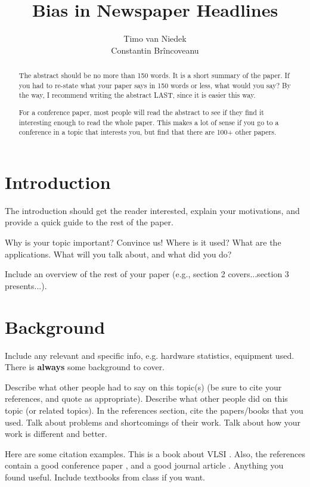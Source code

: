 \documentclass[final]{ieee}
\title[journalExample]{Bias in Newspaper Headlines}
\author[Lastname]{%
   Timo van Niedek\member{Student} \\
   Constantin Br\^{i}ncoveanu\member{Student}
    \authorinfo{%
     Cognitive Computational Modeling of Language and Web Interaction,\\
      SOW-MKI61-2016-SEM2-V, 13th July 2017, Dr. G.E. Kachergis. \\
      email: \mbox{c.brincoveanu@student.ru.nl}} 
}
\begin{document}
\maketitle


\begin{abstract}
The abstract should be no more than 150 words.
It is a short summary of the paper. If you had to
re-state what your paper says in 150 words or less, what would you
say? By the way, I recommend writing the abstract LAST, since it is
      easier this way.

      For a conference paper, most people will read the abstract to see
      if they find it interesting enough to read the whole paper. This
      makes a lot of sense if you go to a conference in a topic that
      interests you, but find that there are 100+ other papers.
\end{abstract}

\section{Introduction}\label{sec:intro}
 
     The introduction should get the reader interested, explain your
     motivations, and provide a quick guide to the rest of the paper.
     
      Why is your topic important? Convince us!
      Where is it used? What are the applications.
      What will you talk about, and what did you do?

     Include an overview of the rest of your paper (e.g., section 2
            covers...section 3 presents...).
            
            
\section{Background}
 
 Include any relevant and specific info,
 e.g. hardware statistics, equipment used.
 There is {\bf always} some background to cover.
            
           Describe what other people had to say on this topic(s)
            (be sure to cite your references, and quote as appropriate).
           Describe what other people did on this topic (or related topics).
           In the references section, cite the papers/books that you used.
Talk about problems and shortcomings of their work.
Talk about how your work is different and better.

Here are some citation examples. 
This is a book about VLSI \cite{Weste93}.
Also, the references contain a good conference paper \cite{LiY88},
and a good journal article \cite{BiS92}.
Anything you found useful.
Include textbooks from class if you want.
\end{document}

